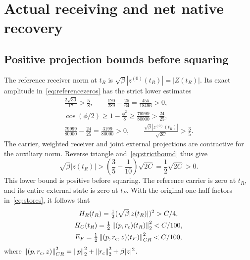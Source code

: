 \section{Actual receiving and net native recovery}\label{sec:actual}
\subsection{Positive projection bounds before squaring}\label{sec:projections}
The reference receiver norm at $t_R$ is
$\sqrt\beta|z^{(0)}(t_R)|=|Z(t_R)|$. Its exact amplitude in~\eqref{eq:referencezeros} has the strict lower estimates
\begin{equation}\label{eq:receiverreference}%
\begin{gathered}
 \frac{2\sqrt{30}}{17}>\frac58,\qquad
 \frac{120}{289}-\frac{25}{64}=\frac{455}{18496}>0,\\
 \cos(\phi/2)\ge1-\frac{\phi^2}{8}
 \ge\frac{79999}{80000}>\frac{24}{25},\\
 \frac{79999}{80000}-\frac{24}{25}=\frac{3199}{80000}>0,\qquad
 \frac{\sqrt\beta|z^{(0)}(t_R)|}{\sqrt{2C}}>\frac35 .
\end{gathered}
\end{equation}
The carrier, weighted receiver and joint external projections are contractive for the auxiliary norm. Reverse triangle and~\eqref{eq:strictbound} thus give
\[
 \sqrt\beta|z(t_R)|
 >\left(\frac35-\frac1{10}\right)\sqrt{2C}
 =\frac12\sqrt{2C}>0 .
\]
This lower bound is positive before squaring. The reference carrier is zero at $t_R$, and its entire external state is zero at $t_F$. With the original one-half factors in~\eqref{eq:stores}, it follows that
\begin{equation}\label{eq:actualstocks}%
\begin{gathered}
 H_R(t_R)=\tfrac12(\sqrt\beta|z(t_R)|)^2>C/4,\\
 H_C(t_R)=\tfrac12\norm{(p,r_c)(t_R)}_2^2<C/100,\\
 E_F=\tfrac12\norm{(p,r_c,z)(t_F)}_{CR}^2<C/100,
\end{gathered}
\end{equation}
where $\left\|(p,r_c,z)\right\|_{CR}^2=\left\|p\right\|_2^2+\left\|r_c\right\|_2^2+\beta|z|^2$.

